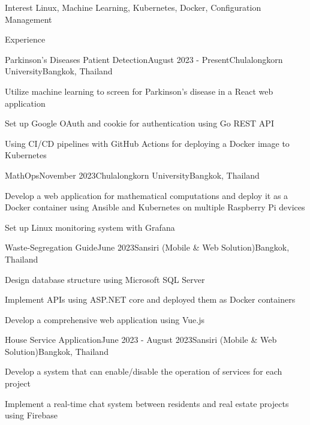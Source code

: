 \documentclass[12pt]{resume}
\begin{document}
\begin{rSection}{Interest}
    Linux, Machine Learning, Kubernetes, Docker, Configuration Management
\end{rSection}

\begin{rSection}{Experience}

	\begin{rSubsection}{Parkinson's Diseases Patient Detection}{August 2023 - Present}{Chulalongkorn University}{Bangkok, Thailand}
        \item Utilize machine learning to screen for Parkinson's disease in a React web application
        \item Set up Google OAuth and cookie for authentication using Go REST API
        \item Using CI/CD pipelines with GitHub Actions for deploying a Docker image to Kubernetes
	\end{rSubsection}

	\begin{rSubsection}{MathOps}{November 2023}{Chulalongkorn University}{Bangkok, Thailand}
        \item Develop a web application for mathematical computations and deploy it as a Docker container using Ansible and Kubernetes on multiple Raspberry Pi devices
        \item Set up Linux monitoring system with Grafana
	\end{rSubsection}

	\begin{rSubsection}{Waste-Segregation Guide}{June 2023}{Sansiri (Mobile \& Web Solution)}{Bangkok, Thailand}
        \item Design database structure using Microsoft SQL Server
        \item Implement APIs using ASP.NET core and deployed them as Docker containers
        \item Develop a comprehensive web application using Vue.js
	\end{rSubsection}

    \begin{rSubsection}{House Service Application}{June 2023 - August 2023}{Sansiri (Mobile \& Web Solution)}{Bangkok, Thailand}
        \item Develop a system that can enable/disable the operation of services for each project
        \item Implement a real-time chat system between residents and real estate projects using Firebase
    \end{rSubsection}

\end{rSection}
\end{document}
